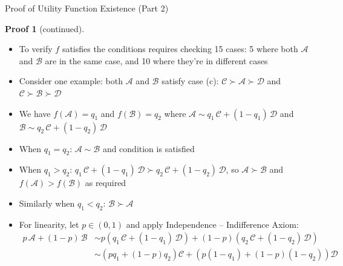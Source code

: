 \documentclass[10pt,handout]{beamer}
\newcommand{\ds}{\displaystyle}
\theoremstyle{definition}
\newtheorem*{prf}{Proof}
\begin{document}
\begin{frame}{Proof of Utility Function Existence (Part 2)}
  \begin{prf}[continued]
    \begin{itemize}[<+->]
      \item To verify $f$ satisfies the conditions requires checking 15 cases: 5 where both $\mathcal{A}$ and $\mathcal{B}$ are in the same case, and 10 where they're in different cases
      \item Consider one example: both $\mathcal{A}$ and $\mathcal{B}$ satisfy case (c): $\mathcal{C} \succ \mathcal{A} \succ \mathcal{D}$ and $\mathcal{C} \succ \mathcal{B} \succ \mathcal{D}$
      \item We have $f(\mathcal{A}) = q_1$ and $f(\mathcal{B}) = q_2$ where $\ds\mathcal{A} \sim q_1\,\mathcal{C} + (1-q_1)\,\mathcal{D}$ and $\ds\mathcal{B} \sim q_2\,\mathcal{C} + (1-q_2)\,\mathcal{D}$
      \item When $q_1 = q_2$: $\mathcal{A} \sim \mathcal{B}$ and condition is satisfied
      \item When $q_1 > q_2$: $\ds q_1\,\mathcal{C} + (1-q_1)\,\mathcal{D} \succ q_2\,\mathcal{C} + (1-q_2)\,\mathcal{D}$, so $\mathcal{A} \succ \mathcal{B}$ and $f(\mathcal{A}) > f(\mathcal{B})$ as required
      \item Similarly when $q_1 < q_2$: $\mathcal{B} \succ \mathcal{A}$ 
      \item For linearity, let $p \in (0, 1)$ and apply Independence -- Indifference Axiom:
        \begin{align*}
          p\,\mathcal{A} + (1-p)\,\mathcal{B} &\sim p(q_1\,\mathcal{C} + (1-q_1)\,\mathcal{D}) + (1-p)(q_2\,\mathcal{C} + (1-q_2)\,\mathcal{D})\\
          &\sim (pq_1 + (1-p)q_2)\mathcal{C} + (p(1-q_1) + (1-p)(1-q_2))\mathcal{D}
        \end{align*}
    \end{itemize}
    \vspace{-5mm}
  \end{prf}
\end{frame}
\end{document}
